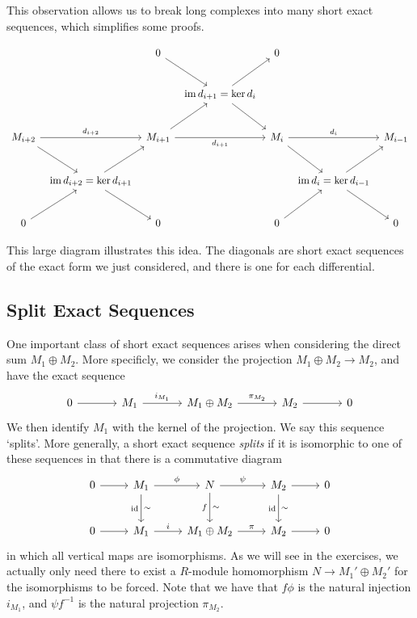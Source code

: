 This observation allows us to break long complexes into many short exact sequences, which simplifies some proofs.

\[\begin{tikzcd}[row sep=2.5em, column sep=0.5em]
	&&0\arrow[dr]&&0\\
	&&&\operatorname{im}d_{i+1} =\ker d_i\arrow[ru]\arrow[dr]\\
	M_{i+2}\arrow[rr, "d_{i+2}"]\arrow[dr]&&M_{i+1}\arrow[rr, "d_{i+1}"']\arrow[ur]&&M_{i}\arrow[rr, "d_i"]\arrow[dr]&&M_{i-1}\\
					      &\operatorname{im} d_{i+2}=\ker d_{i+1}\arrow[ru]\arrow[dr]&&&&\operatorname{im} d_{i}=\ker d_{i-1}\arrow[dr]\arrow[ur]\\
	0\arrow[ru]&&0&&0\arrow[ru]&&0
\end{tikzcd}\]

This large diagram illustrates this idea. The diagonals are short exact sequences of the exact form we just considered, and there is one for each differential.

\subsection{Split Exact Sequences}

One important class of short exact sequences arises when considering the direct sum $M_1\oplus M_2$. More specificly, we consider the projection $M_1\oplus M_2 \to M_2$, and have the exact sequence
\[\begin{tikzcd}[row sep=2.5em, column sep=3.5em]
	0\arrow[r]&M_1\arrow[r, "i_{M_1}"]&M_1\oplus M_2\arrow[r, "\pi_{M_2}"]&M_2\arrow[r]&0
\end{tikzcd}\]
We then identify $M_1$ with the kernel of the projection. We say this sequence `splits'. More generally, a short exact sequence \emph{splits} if it is isomorphic to one of these sequences in that there is a commutative diagram
\[\begin{tikzcd}[row sep=2.5em, column sep=2.5em]
	0\arrow[r]&M_1\arrow[d, "\sim ", "\mathrm{id} "']\arrow[r, "\phi "]&N\arrow[d, "\sim ", "f"']\arrow[r, "\psi "]&M_2\arrow[d, "\sim ", "\mathrm{id} "']\arrow[r]&0\\
	0\arrow[r]&M_1\arrow[r, "i"]&M_1\oplus M_2\arrow[r, "\pi "]&M_2\arrow[r]&0
\end{tikzcd}\]
in which all vertical maps are isomorphisms. As we will see in the exercises, we actually only need there to exist a $R$-module homomorphism $N\to M_1'\oplus M_2'$ for the isomorphisms to be forced. Note that we have that $f\phi $ is the natural injection $i_{M_1}$, and $\psi  f^{-1}$ is the natural projection $\pi_{M_2}$.

